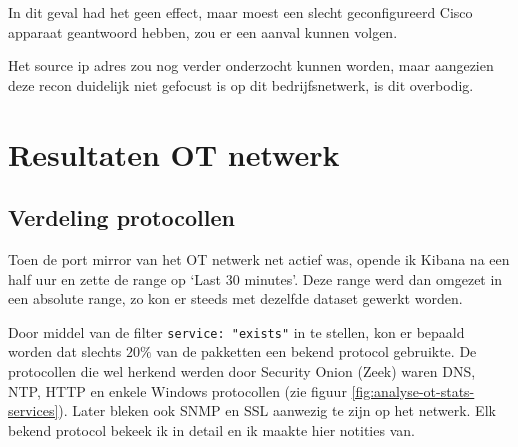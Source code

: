 \documentclass[a4paper,12pt]{report}
\begin{document}
In dit geval had het geen effect, maar moest een slecht geconfigureerd Cisco apparaat geantwoord hebben, zou er een aanval kunnen volgen.

Het source ip adres zou nog verder onderzocht kunnen worden, maar aangezien deze recon duidelijk niet gefocust is op dit bedrijfsnetwerk, is dit overbodig.


\section{Resultaten OT netwerk}
\subsection{Verdeling protocollen}
Toen de port mirror van het OT netwerk net actief was, opende ik Kibana na een half uur en zette de range op `Last 30 minutes'.
Deze range werd dan omgezet in een absolute range, zo kon er steeds met dezelfde dataset gewerkt worden.

Door middel van de filter \lstinline|service: "exists"| in te stellen, kon er bepaald worden dat slechts $20\%$ van de pakketten een bekend protocol gebruikte.
De protocollen die wel herkend werden door Security Onion (Zeek) waren DNS, NTP, HTTP en enkele Windows protocollen (zie figuur \ref{fig:analyse-ot-stats-services}).
Later bleken ook SNMP en SSL aanwezig te zijn op het netwerk.
Elk bekend protocol bekeek ik in detail en ik maakte hier notities van.
\end{document}

